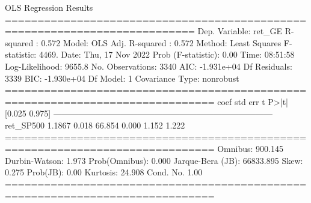 \begin{ioutput}
OLS Regression Results                                
===========================================================================
Dep. Variable:                 ret_GE   R-squared :                   0.572
Model:                            OLS   Adj. R-squared :              0.572
Method:                 Least Squares   F-statistic:                  4469.
Date:                Thu, 17 Nov 2022   Prob (F-statistic):            0.00
Time:                        08:51:58   Log-Likelihood:              9655.8
No. Observations:                3340   AIC:                     -1.931e+04
Df Residuals:                    3339   BIC:                     -1.930e+04
Df Model:                           1                                                  
Covariance Type:            nonrobust                                                  
==============================================================================
coef          std err          t      P>|t|      [0.025      0.975]
------------------------------------------------------------------------------
ret_SP500      1.1867      0.018     66.854      0.000       1.152       1.222
==============================================================================
Omnibus:                      900.145   Durbin-Watson:                   1.973
Prob(Omnibus):                  0.000   Jarque-Bera (JB):            66833.895
Skew:                           0.275   Prob(JB):                         0.00
Kurtosis:                      24.908   Cond. No.                         1.00
==============================================================================
\end{ioutput}


